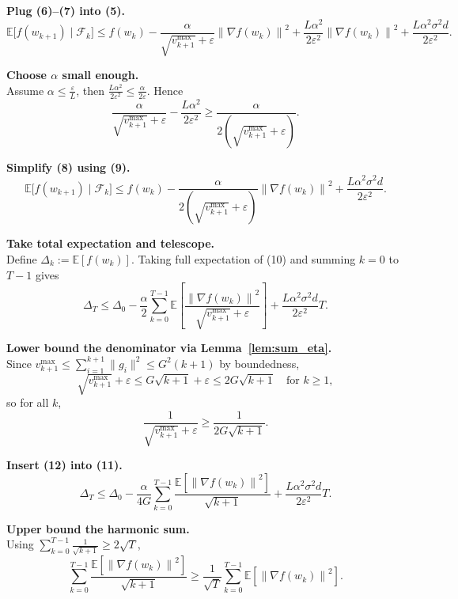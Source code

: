 \documentclass{article}
\newcommand{\E}{\mathbb{E}}
\newcommand{\norm}[1]{\left\|#1\right\|}
\newcommand{\grad}{\nabla}
\begin{document}
\begin{enumerate}[label={[\textbf{Step \arabic*.}]}, leftmargin=*]
\item \textbf{Plug (6)–(7) into (5).}\\
\[
\E\!\big[f(w_{k+1})\mid\mathcal{F}_{k}\big]
\le f(w_{k})
-\frac{\alpha}{\sqrt{v_{k+1}^{\max}}+\varepsilon}\norm{\grad f(w_{k})}^{2}
+\frac{L\alpha^{2}}{2\varepsilon^{2}}\norm{\grad f(w_{k})}^{2}
+\frac{L\alpha^{2}\sigma^{2}d}{2\varepsilon^{2}}.
\tag{8}
\]

\item \textbf{Choose $\alpha$ small enough.}\\
Assume $\alpha\le \frac{\varepsilon}{L}$, then $\frac{L\alpha^{2}}{2\varepsilon^{2}}\le\frac{\alpha}{2\varepsilon}$. Hence
\[
\frac{\alpha}{\sqrt{v_{k+1}^{\max}}+\varepsilon}
-\frac{L\alpha^{2}}{2\varepsilon^{2}}
\ge
\frac{\alpha}{2(\sqrt{v_{k+1}^{\max}}+\varepsilon)}.
\tag{9}
\]

\item \textbf{Simplify (8) using (9).}\\
\[
\E\!\big[f(w_{k+1})\mid\mathcal{F}_{k}\big]
\le f(w_{k})
-\frac{\alpha}{2(\sqrt{v_{k+1}^{\max}}+\varepsilon)}\norm{\grad f(w_{k})}^{2}
+\frac{L\alpha^{2}\sigma^{2}d}{2\varepsilon^{2}}.
\tag{10}
\]

\item \textbf{Take total expectation and telescope.}\\
Define $\Delta_{k}:=\E[f(w_{k})]$. Taking full expectation of (10) and summing $k=0$ to $T-1$ gives
\[
\Delta_{T}\le \Delta_{0}
-\frac{\alpha}{2}\sum_{k=0}^{T-1}\E\!\left[\frac{\norm{\grad f(w_{k})}^{2}}{\sqrt{v_{k+1}^{\max}}+\varepsilon}\right]
+\frac{L\alpha^{2}\sigma^{2}d}{2\varepsilon^{2}}T.
\tag{11}
\]

\item \textbf{Lower bound the denominator via Lemma~\ref{lem:sum_eta}.}\\
Since $v_{k+1}^{\max}\le\sum_{i=1}^{k+1}\|g_{i}\|^{2}\le G^{2}(k+1)$ by boundedness,
\[
\sqrt{v_{k+1}^{\max}}+\varepsilon\le G\sqrt{k+1}+\varepsilon\le 2G\sqrt{k+1}
\quad\text{for }k\ge1,
\]
so for all $k$,
\[
\frac{1}{\sqrt{v_{k+1}^{\max}}+\varepsilon}\ge\frac{1}{2G\sqrt{k+1}}.
\tag{12}
\]

\item \textbf{Insert (12) into (11).}\\
\[
\Delta_{T}\le \Delta_{0}
-\frac{\alpha}{4G}\sum_{k=0}^{T-1}\frac{\E[\norm{\grad f(w_{k})}^{2}]}{\sqrt{k+1}}
+\frac{L\alpha^{2}\sigma^{2}d}{2\varepsilon^{2}}T.
\tag{13}
\]

\item \textbf{Upper bound the harmonic sum.}\\
Using $\sum_{k=0}^{T-1}\frac{1}{\sqrt{k+1}}\ge 2\sqrt{T}$,
\[
\sum_{k=0}^{T-1}\frac{\E[\norm{\grad f(w_{k})}^{2}]}{\sqrt{k+1}}
\ge
\frac{1}{\sqrt{T}}\sum_{k=0}^{T-1}\E[\norm{\grad f(w_{k})}^{2}].
\tag{14}
\]


\end{enumerate}
\end{document}
